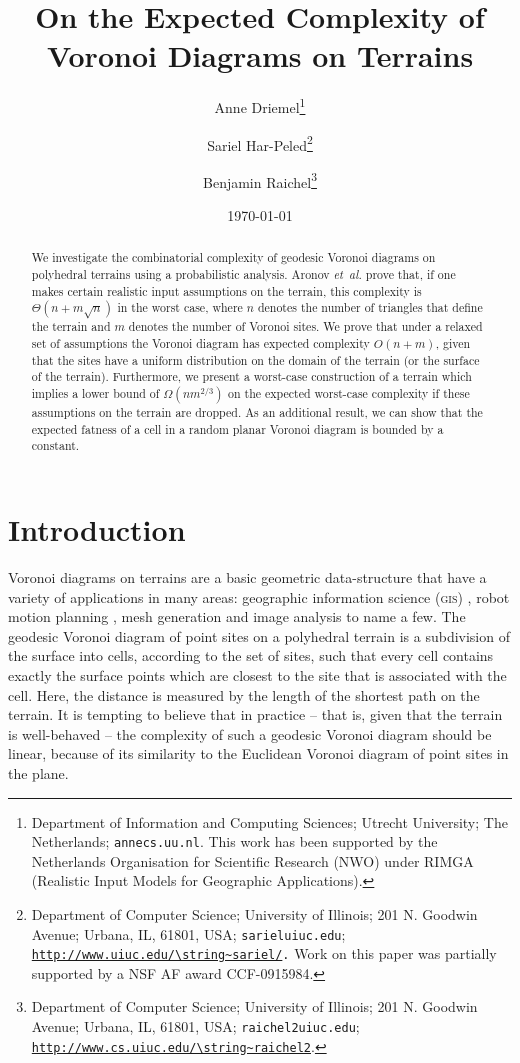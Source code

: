 \documentclass[12pt]{article}
\providecommand{\si}[1]{#1}
\newcommand{\AnneThanks}[1]{\thanks{Department of Information and Computing Sciences; Utrecht
      University; The Netherlands;
      \texttt{anne}\hspace{0cm}\texttt{\atgen{}cs.uu.nl}. #1}}
\newcommand{\BenThanks}[1]{\thanks{Department of Computer Science;
      University of Illinois; 201 N. Goodwin Avenue; Urbana, IL, 61801, USA; {\tt \si{raichel}2\atgen{}\si{uiuc}.\si{edu}}; {\tt \url{\si{http://www.cs.uiuc.edu/\string~\si{raichel2}}}}. #1}}
\newcommand{\atgen}{\symbol{'100}}
\newcommand{\SarielThanks}[1]{\thanks{Department of Computer Science;
      University of Illinois; 201 N. Goodwin Avenue; Urbana, IL,
      61801, USA; {\tt \si{sariel}\atgen{}\si{uiuc.edu}}; {\tt \url{http://www.uiuc.edu/\string~sariel/}.} #1}}
\newcommand{\seclab}[1]{\label{sec:#1}}
\newcommand{\etal}{\textit{et~al.}\xspace}
\begin{document}
\title{On the Expected Complexity of\\ Voronoi Diagrams on Terrains}

\author{Anne Driemel\AnneThanks{This work has been supported by the Netherlands
      Organisation for Scientific Research (NWO) under RIMGA
      (Realistic Input Models for Geographic Applications).}\and Sariel Har-Peled\SarielThanks{Work on this paper was partially supported by a NSF
      AF award CCF-0915984.}\and Benjamin Raichel\BenThanks{} }

\date{\today}

\maketitle


\begin{abstract}
    We investigate the combinatorial complexity of geodesic Voronoi
    diagrams on polyhedral terrains using a probabilistic
    analysis. Aronov \etal \cite{abt-cbvdrt-08} prove that, if one
    makes certain realistic input assumptions on the terrain, this
    complexity is $\Theta(n + m \sqrt{n})$ in the worst case, where
    $n$ denotes the number of triangles that define the terrain and
    $m$ denotes the number of Voronoi sites. We prove that under a
    relaxed set of assumptions the Voronoi diagram has expected
    complexity $O(n+m)$, given that the sites have a uniform
    distribution on the domain of the terrain (or the surface of the
    terrain).  Furthermore, we present a worst-case construction of a
    terrain which implies a lower bound of $\Omega(n m^{2/3})$ on the
    expected worst-case complexity if these assumptions on the terrain
    are dropped.  As an additional result, we can show that the
    expected fatness of a cell in a random planar Voronoi diagram is
    bounded by a constant.
\end{abstract}

\section{Introduction}
\seclab{intro}

Voronoi diagrams on terrains are a basic geometric data-structure that
have a variety of applications in many areas: geographic information
science (\textsc{\si{gis}}) \cite{ajt-vbra-01, dg-tsvdgn-08,
   pa-cnmwvd-06, cg-frn-10}, robot motion planning \cite{ts-mpgvd-89},
mesh generation \cite{kwr-gvdps-97} and image analysis
\cite{sf-clssf-04, wdy-paadm-08} to name a few.  The geodesic Voronoi
diagram of point sites on a polyhedral terrain is a subdivision of the
surface into cells, according to the set of sites, such that every
cell contains exactly the surface points which are closest to the site
that is associated with the cell. Here, the distance is measured by
the length of the shortest path on the terrain. It is tempting to
believe that in practice -- that is, given that the terrain is
well-behaved -- the complexity of such a geodesic Voronoi diagram
should be linear, because of its similarity to the Euclidean Voronoi
diagram of point sites in the plane.
\end{document}
